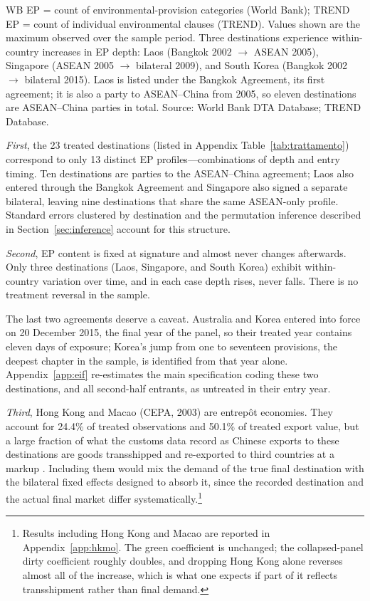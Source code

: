 \documentclass[12pt]{article}
\begin{document}
\begin{table}[htbp]
\begin{threeparttable}
\begin{tablenotes}
WB EP = count of environmental-provision categories (World Bank); TREND EP = count of
individual environmental clauses (TREND). Values shown are the maximum observed over
the sample period. Three destinations experience within-country increases in EP depth:
Laos (Bangkok 2002 $\to$ ASEAN 2005), Singapore (ASEAN 2005 $\to$ bilateral 2009), and
South Korea (Bangkok 2002 $\to$ bilateral 2015). Laos is listed under the Bangkok Agreement, its first agreement; it is also a party to ASEAN--China from 2005, so eleven destinations are ASEAN--China parties in total. Source: World Bank DTA Database; TREND Database.
\end{tablenotes}
\end{threeparttable}
\end{table}

\emph{First}, the 23 treated destinations (listed in Appendix Table~\ref{tab:trattamento}) correspond to only 13 distinct EP profiles---combinations of depth and entry timing. Ten destinations are parties to the ASEAN--China agreement; Laos also entered through the Bangkok Agreement and Singapore also signed a separate bilateral, leaving nine destinations that share the same ASEAN-only profile. Standard errors clustered by destination and the permutation inference described in Section~\ref{sec:inference} account for this structure.

\emph{Second}, EP content is fixed at signature and almost never changes afterwards. Only
three destinations (Laos, Singapore, and South Korea) exhibit within-country variation
over time, and in each case depth rises, never falls. There is no treatment reversal
in the sample.

The last two agreements deserve a caveat. Australia and Korea entered into force on 20 December
2015, the final year of the panel, so their treated year contains eleven days of exposure; Korea's
jump from one to seventeen provisions, the deepest chapter in the sample, is identified from that
year alone. Appendix~\ref{app:eif} re-estimates the main specification coding these two
destinations, and all second-half entrants, as untreated in their entry year.

\emph{Third}, Hong Kong and Macao (CEPA, 2003) are entrepôt economies. They account for
24.4\% of treated observations and 50.1\% of treated export value, but a large fraction
of what the customs data record as Chinese exports to these destinations are goods
transshipped and re-exported to third countries at a markup \citep{feenstra2004}.
Including them would mix the demand of the true final destination with the bilateral
fixed effects designed to absorb it, since the recorded destination and the actual
final market differ systematically.\footnote{Results including Hong Kong and Macao are
reported in Appendix~\ref{app:hkmo}. The green coefficient is unchanged; the collapsed-panel
dirty coefficient roughly doubles, and dropping Hong Kong alone reverses almost all of the increase,
which is what one expects if part of it reflects transshipment rather than final demand.}
\end{document}
